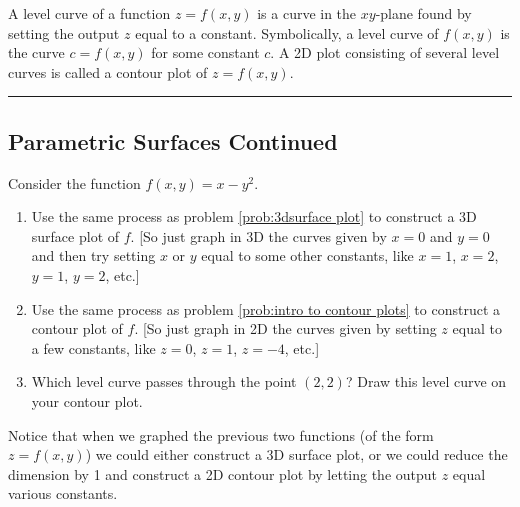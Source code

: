 \begin{definition}
 A level curve of a function $z=f(x,y)$ is a curve in the $xy$-plane found by setting the output $z$ equal to a constant. Symbolically, a level curve of $f(x,y)$ is the curve $c=f(x,y)$ for some constant $c$.  A 2D plot consisting of several level curves is called a contour plot of $z=f(x,y)$.
\end{definition}

\vspace{0.1in}
\hrule
\vspace{0.1in}

\subsection{Parametric Surfaces Continued}

\begin{problem}

%
 Consider the function $f(x,y)=x-y^2$.
\begin{enumerate}
 \item Use the same process as problem \ref{prob:3dsurface plot} to construct a 3D surface plot of $f$. [So just graph in 3D the curves given by $x=0$ and $y=0$ and then try setting $x$ or $y$ equal to some other constants, like $x=1$, $x=2$, $y=1$, $y=2$, etc.]
 \item Use the same process as problem \ref{prob:intro to contour plots} to construct a contour plot of $f$. [So just graph in 2D the curves given by setting $z$ equal to a few constants, like $z=0$, $z=1$, $z=-4$, etc.]
 \item%
%
Which level curve passes through the point $(2,2)$?  Draw this level curve on your contour plot.
\end{enumerate}
\end{problem}

Notice that when we graphed the previous two functions (of the form $z=f(x,y)$) we could either construct a 3D surface plot, or we could reduce the dimension by 1 and construct a 2D contour plot by letting the output $z$ equal various constants. \\

